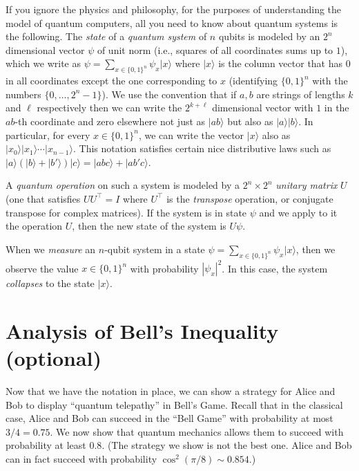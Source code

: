 If you ignore the physics and philosophy, for the purposes of
understanding the model of quantum computers, all you need to know about
quantum systems is the following. The \emph{state} of a \emph{quantum
system} of \(n\) qubits is modeled by an \(2^n\) dimensional vector
\(\psi\) of unit norm (i.e., squares of all coordinates sums up to
\(1\)), which we write as
\(\psi=\sum_{x\in \{0,1\}^n} \psi_x |x \rangle\) where \(|x\rangle\) is
the column vector that has \(0\) in all coordinates except the one
corresponding to \(x\) (identifying \(\{0,1\}^n\) with the numbers
\(\{0,\ldots,2^n-1\}\)). We use the convention that if \(a,b\) are
strings of lengths \(k\) and \(\ell\) respectively then we can write the
\(2^{k+\ell}\) dimensional vector with \(1\) in the \(ab\)-th coordinate
and zero elsewhere not just as \(|ab\rangle\) but also as
\(|a\rangle |b \rangle\). In particular, for every \(x\in \{0,1\}^n\),
we can write the vector \(|x\rangle\) also as
\(|x_0\rangle |x_1\rangle \cdots |x_{n-1} \rangle\). This notation
satisfies certain nice distributive laws such as
\(|a\rangle(|b\rangle + |b'\rangle)|c \rangle = |abc \rangle + |ab'c\rangle\).

A \emph{quantum operation} on such a system is modeled by a
\(2^n \times 2^n\) \emph{unitary matrix} \(U\) (one that satisfies
\(\ensuremath{\mathit{UU}}^\top = I\) where \(U^\top\) is the
\emph{transpose} operation, or conjugate transpose for complex
matrices). If the system is in state \(\psi\) and we apply to it the
operation \(U\), then the new state of the system is \(U\psi\).

When we \emph{measure} an \(n\)-qubit system in a state
\(\psi= \sum_{x\in \{0,1\}^n} \psi_x |x \rangle\), then we observe the
value \(x\in \{0,1\}^n\) with probability \(|\psi_x|^2\). In this case,
the system \emph{collapses} to the state \(|x \rangle\).

\section{Analysis of Bell's Inequality
(optional)}\label{Analysis-of-Bells-Inequal}

Now that we have the notation in place, we can show a strategy for Alice
and Bob to display ``quantum telepathy'' in Bell's Game. Recall that in
the classical case, Alice and Bob can succeed in the ``Bell Game'' with
probability at most \(3/4 = 0.75\). We now show that quantum mechanics
allows them to succeed with probability at least \(0.8\). (The strategy
we show is not the best one. Alice and Bob can in fact succeed with
probability \(\cos^2(\pi/8) \sim 0.854\).)

